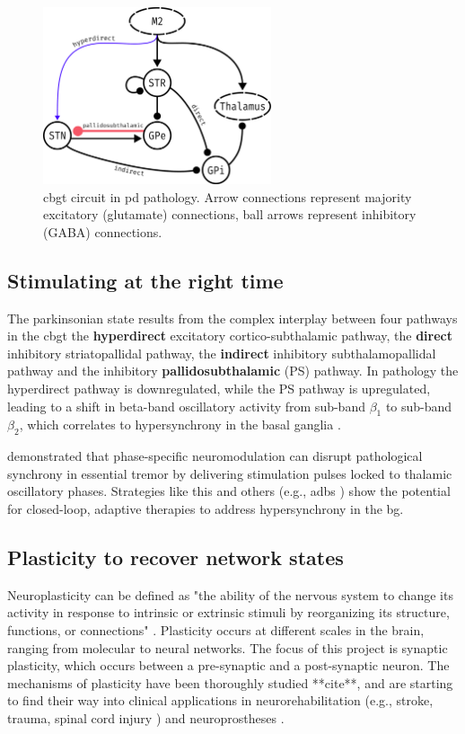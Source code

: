 \begin{figure}[ht]
	\centering
	\includegraphics[width=0.6\textwidth]{figs/cbgt_circuit.pdf}
	\caption{\acrshort{cbgt} circuit in \acrshort{pd} pathology. Arrow connections represent majority excitatory (glutamate) connections,
		ball arrows represent inhibitory (GABA) connections.}
\end{figure}

\subsection{Stimulating at the right time}
The parkinsonian state results from the complex interplay between four pathways in the \acrshort{cbgt}
the \textbf{hyperdirect} excitatory cortico-subthalamic pathway,
the \textbf{direct} inhibitory striatopallidal pathway,
the \textbf{indirect} inhibitory subthalamopallidal pathway and
the inhibitory \textbf{pallidosubthalamic} (PS) pathway. In pathology the hyperdirect
pathway is downregulated, while the PS pathway is upregulated, leading to a shift in
beta-band oscillatory activity from sub-band $\beta_1$ to sub-band $\beta_2$, which correlates to
hypersynchrony in the basal ganglia \cite{west2022stimulating}.

\cite{cagnan2017stimulating} demonstrated that phase-specific neuromodulation can disrupt pathological
synchrony in essential tremor by delivering stimulation pulses locked to thalamic oscillatory phases.
Strategies like this and others (e.g., \acrshort{adbs} \cite{beudel2018adaptive}) show the potential for closed-loop,
adaptive therapies to address hypersynchrony in the \acrshort{bg}.

\subsection{Plasticity to recover network states}
Neuroplasticity can be defined as "the ability of the nervous system to change its activity in
response to intrinsic or extrinsic stimuli by reorganizing its structure, functions, or
connections" \cite{mateos2019impact}.
Plasticity occurs at different scales in the brain, ranging from molecular to neural networks.
The focus of this project is synaptic plasticity, which occurs between a pre-synaptic and a
post-synaptic neuron. The mechanisms of plasticity have been thoroughly studied **cite**, and
are starting to find their way into clinical applications in neurorehabilitation (e.g., stroke, trauma,
spinal cord injury \cite{cramer2011harnessing}) and neuroprostheses \cite{lebedev2017brain}.

